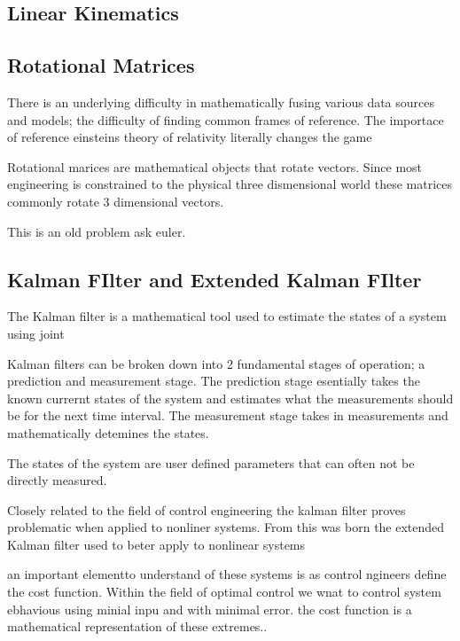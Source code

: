 \cite{zajac2003biomechanics}


\subsection{Linear Kinematics}








\subsection{Rotational Matrices}
There is an underlying difficulty in mathematically fusing various data sources and models; the difficulty of finding common frames of reference. The importace of reference einsteins theory of relativity literally changes the game

Rotational marices are mathematical objects that rotate vectors.
Since most engineering is constrained to the physical three dismensional world these matrices commonly rotate 3 dimensional vectors. 

This is an old problem ask euler.











\subsection{Kalman FIlter and Extended Kalman FIlter}
The Kalman filter is a mathematical tool used to estimate the states of a system using joint 

Kalman filters can be broken down into 2 fundamental stages of operation; a prediction and measurement stage. The prediction stage esentially takes the known currernt states of the system and estimates what the measurements should be for the next time interval. The measurement stage takes in measurements and mathematically detemines the states.

The states of the system are user defined parameters that can often not be directly measured.

Closely related to the field of control engineering the kalman filter proves problematic when applied to nonliner systems. From this was born the extended Kalman filter used to beter apply to nonlinear systems

an important elementto understand of these systems is as control ngineers define the cost function. Within the field of optimal control we wnat to control system ebhavious using minial inpu and with minimal error. the cost function is a mathematical representation of these extremes.. 

















